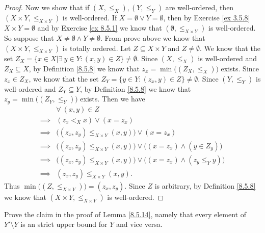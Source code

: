 \begin{proof}
    Now we show that if \((X, \leq_X), (Y, \leq_Y)\) are well-ordered, then \((X \times Y, \leq_{X \times Y})\) is well-ordered.
    If \(X = \emptyset \lor Y = \emptyset\), then by Exercise \ref{ex 3.5.8} \(X \times Y = \emptyset\) and by Exercise \ref{ex 8.5.1} we know that \((\emptyset, \leq_{X \times Y})\) is well-ordered.
    So suppose that \(X \neq \emptyset \land Y \neq \emptyset\).
    From prove above we know that \((X \times Y, \leq_{X \times Y})\) is totally ordered.
    Let \(Z \subseteq X \times Y\) and \(Z \neq \emptyset\).
    We know that the set \(Z_X = \{x \in X | \exists\ y \in Y : (x, y) \in Z\} \neq \emptyset\).
    Since \((X, \leq_X)\) is well-ordered and \(Z_X \subseteq X\), by Definition \ref{8.5.8} we know that \(z_x = \min\big((Z_X, \leq_X)\big)\) exists.
    Since \(z_x \in Z_X\), we know that the set \(Z_Y = \{y \in Y : (z_x, y) \in Z\} \neq \emptyset\).
    Since \((Y, \leq_Y)\) is well-ordered and \(Z_Y \subseteq Y\), by Definition \ref{8.5.8} we know that \(z_y = \min\big((Z_Y, \leq_Y)\big)\) exists.
    Then we have
    \begin{align*}
                 & \forall\ (x, y) \in Z                                                                       \\
        \implies & (z_x <_X x) \lor (x = z_x)                                                                  \\
        \implies & \big((z_x, z_y) \leq_{X \times Y} (x, y)\big) \lor (x = z_x)                                \\
        \implies & \big((z_x, z_y) \leq_{X \times Y} (x, y)\big) \lor \big((x = z_x) \land (y \in Z_y)\big)    \\
        \implies & \big((z_x, z_y) \leq_{X \times Y} (x, y)\big) \lor \big((x = z_x) \land (z_y \leq_Y y)\big) \\
        \implies & (z_x, z_y) \leq_{X \times Y} (x, y).
    \end{align*}
    Thus \(\min\big((Z, \leq_{X \times Y})\big) = (z_x, z_y)\).
    Since \(Z\) is arbitrary, by Definition \ref{8.5.8} we know that \((X \times Y, \leq_{X \times Y})\) is well-ordered.
\end{proof}

\begin{exercise}\label{ex 8.5.13}
    Prove the claim in the proof of Lemma \ref{8.5.14}, namely that every element of \(Y' \setminus Y\) is an strict upper bound for \(Y\) and vice versa.
\end{exercise}

